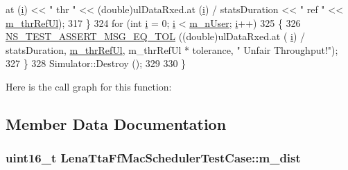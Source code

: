 \begin{DoxyCode}
      at (\hyperlink{bernuolliDistribution_8m_a6f6ccfcf58b31cb6412107d9d5281426}{i}) << \textcolor{stringliteral}{"  thr "} << (double)ulDataRxed.at (\hyperlink{bernuolliDistribution_8m_a6f6ccfcf58b31cb6412107d9d5281426}{i}) / statsDuration << \textcolor{stringliteral}{" ref "} << 
      \hyperlink{classLenaTtaFfMacSchedulerTestCase_a451f6b6555e9901f3b362fe213cb4127}{m\_thrRefUl});
317     \}
324   \textcolor{keywordflow}{for} (\textcolor{keywordtype}{int} \hyperlink{bernuolliDistribution_8m_a6f6ccfcf58b31cb6412107d9d5281426}{i} = 0; \hyperlink{bernuolliDistribution_8m_a6f6ccfcf58b31cb6412107d9d5281426}{i} < \hyperlink{classLenaTtaFfMacSchedulerTestCase_a62553f6f986f9e498a77482da9e649c5}{m\_nUser}; \hyperlink{bernuolliDistribution_8m_a6f6ccfcf58b31cb6412107d9d5281426}{i}++)
325     \{
326       \hyperlink{group__testing_ga9e7861b56b4e70db3b56044cb7a28e41}{NS\_TEST\_ASSERT\_MSG\_EQ\_TOL} ((\textcolor{keywordtype}{double})ulDataRxed.at (
      \hyperlink{bernuolliDistribution_8m_a6f6ccfcf58b31cb6412107d9d5281426}{i}) / statsDuration, \hyperlink{classLenaTtaFfMacSchedulerTestCase_a451f6b6555e9901f3b362fe213cb4127}{m\_thrRefUl}, m\_thrRefUl * tolerance, \textcolor{stringliteral}{" Unfair Throughput!"});
327     \}
328   Simulator::Destroy ();
329 
330 \}
\end{DoxyCode}


Here is the call graph for this function\+:




\subsection{Member Data Documentation}
\subsubsection[{\texorpdfstring{m\+\_\+dist}{m_dist}}]{\setlength{\rightskip}{0pt plus 5cm}uint16\+\_\+t Lena\+Tta\+Ff\+Mac\+Scheduler\+Test\+Case\+::m\+\_\+dist\hspace{0.3cm}{\ttfamily [private]}}\hypertarget{classLenaTtaFfMacSchedulerTestCase_a1017fe2567e0c80556ff9bbaa76176c5}{}\label{classLenaTtaFfMacSchedulerTestCase_a1017fe2567e0c80556ff9bbaa76176c5}
